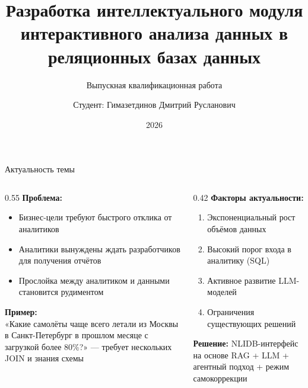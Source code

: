 \documentclass[10pt, aspectratio=169, unicode]{beamer}
\title[ВКР]{Разработка интеллектуального модуля интерактивного анализа данных в реляционных базах данных}
\subtitle{Выпускная квалификационная работа}
\author[Гимазетдинов Д.Р.]{Студент: Гимазетдинов Дмитрий Русланович}
\institute[МАИ]{Московский авиационный институт\\ (Национальный исследовательский университет)}
\date{2026}
\begin{document}
\begin{frame}
  \titlepage
\end{frame}

\begin{frame}{Актуальность темы}
  \begin{columns}[T]
    \begin{column}{0.55\textwidth}
      \textbf{Проблема:}
      \begin{itemize}
        \item Бизнес-цели требуют быстрого отклика от аналитиков
        \item Аналитики вынуждены ждать разработчиков для получения отчётов
        \item Прослойка между аналитиком и данными становится рудиментом
      \end{itemize}
      \vspace{6pt}
      \textbf{Пример:}\\
      {\small«Какие самолёты чаще всего летали из Москвы в Санкт-Петербург в прошлом месяце с загрузкой более 80\%?» — требует нескольких JOIN и знания схемы}
    \end{column}
    \begin{column}{0.42\textwidth}
      \textbf{Факторы актуальности:}
      \begin{enumerate}
        \item Экспоненциальный рост объёмов данных
        \item Высокий порог входа в аналитику (SQL)
        \item Активное развитие LLM-моделей
        \item Ограничения существующих решений
      \end{enumerate}
      \vspace{6pt}
      \textbf{Решение:} NLIDB-интерфейс на основе RAG + LLM + агентный подход + режим самокоррекции
    \end{column}
  \end{columns}
\end{frame}
\end{document}
